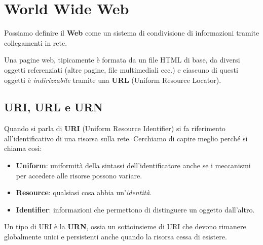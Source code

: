 \section{World Wide Web}
Possiamo definire il \textbf{Web} come un sistema di condivisione di 
informazioni tramite collegamenti in rete.

Una pagine web, tipicamente è formata da un file HTML di base, da 
diversi oggetti referenziati (altre pagine, file multimediali ecc.) e 
ciascuno di questi oggetti è \emph{indirizzabile} tramite una 
\textbf{URL} (Uniform Resource Locator).

\subsection{URI, URL e URN}
Quando si parla di \textbf{URI} (Uniform Resource Identifier) si fa 
riferimento all'identificativo di una risorsa sulla rete. Cerchiamo 
di capire meglio perché si chiama così:
\begin{itemize}
	\item \textbf{Uniform}: uniformità della sintassi 
		dell'identificatore anche se i meccanismi per accedere alle 
		risorse possono variare.
	\item \textbf{Resource}: qualsiasi cosa abbia un'\emph{identità}.
	\item \textbf{Identifier}: informazioni che permettono di 
		distinguere un oggetto dall'altro.
\end{itemize}
Un tipo di URI è la \textbf{URN}, ossia un sottoinsieme di URI che 
devono rimanere globalmente unici e persistenti anche quando la 
risorsa cessa di esistere.

